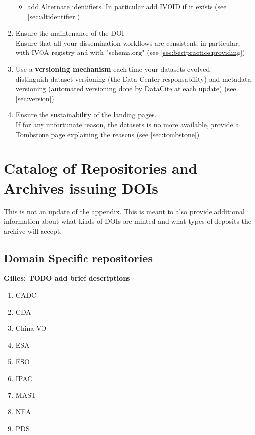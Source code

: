 \documentclass[11pt,a4paper]{ivoa}
\begin{document}
\begin{enumerate}
\begin{itemize}
		\item add Alternate identifiers. In particular add IVOID if it exists (see \ref{sec:altidentifier})
	\end{itemize}
	\item Ensure the maintenance of the DOI\\
	Ensure that all your dissemination workflows are consistent, in particular, with IVOA registry and with "schema.org" (see \ref{sec:bestpractice:providing})
	\item Use a \textbf{versioning mechanism} each time your datasets evolved\\
	distinguish dataset versioning (the Data Center responsability) and metadata versioning (automated versioning done by DataCite at each update) (see \ref{sec:version})
	\item Ensure the sustainability of the landing pages.\\
	If for any unfortunate reason, the datasets is no more available, provide a Tombstone page explaining the reasons (see \ref{sec:tombstone})
\end{enumerate}


\appendix
\section{Catalog of Repositories and Archives issuing DOIs}
\label{sec:catalog}

This is not an update of the \citet{2022ApJS..260....5C} appendix. 
This is meant to also provide additional information about what kinds of DOIs are minted and what types of deposits the archive will accept.

\subsection{Domain Specific repositories}
\textbf{\color{red}Gilles: TODO add brief descriptions}\\

\begin{enumerate}
	\item CADC
	\item CDA
	\item China-VO
	\item ESA
	\item ESO
	\item IPAC
	\item MAST
	\item NEA
	\item PDS
\end{enumerate}
\end{document}
